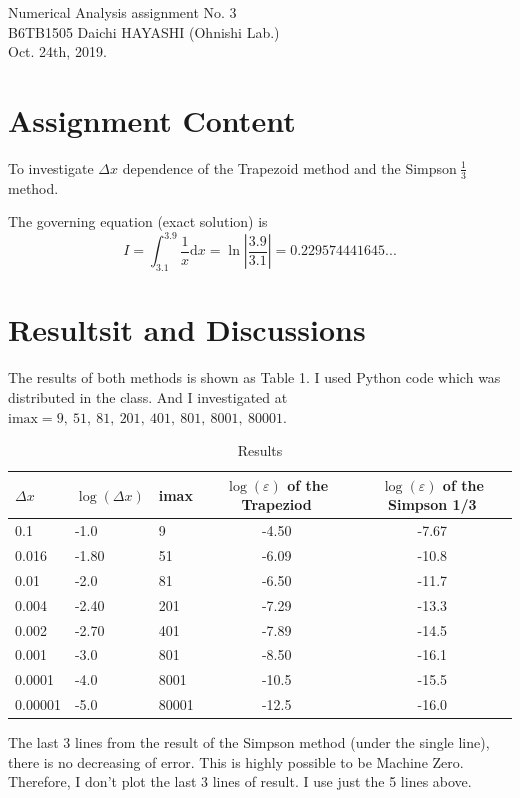 \documentclass[a4paper,11pt]{article}
\begin{document}
%
\begin{center}
  {\fontsize{16pt}{16pt}\selectfont Numerical Analysis assignment No. 3\\}
  \vspace{16pt}
  \fontsize{10.5pt}{12pt}\selectfont
  B6TB1505 Daichi HAYASHI (Ohnishi Lab.)\\
  \vspace{10.5pt}
  Oct. 24th, 2019.\\
  \vspace{-2mm}
\end{center}

\section{Assignment Content}
To investigate $\Delta x$ dependence of the Trapezoid method and the Simpson$~\frac13$ method.

The governing equation (exact solution) is
\begin{equation}
	I = \int_{3.1}^{3.9} \dfrac1x \mathrm{d}x = \ln\left|\dfrac{3.9}{3.1}\right| = 0.229574441645...
\end{equation}

\section{Resultsit and Discussions}
The results of both methods is shown as Table 1. I used Python code which was distributed in the class. And I investigated at	 $\mathrm{imax}= 9,\ 51,\ 81,\ 201,\ 401,\ 801,\  8001,\ 80001$.

\begin{table}[H]
\centering
\caption{Results}
\begin{tabular}{lllcc}
  $\Delta x$& $\log(\Delta x)$ & imax & $\log (\varepsilon)$ of the Trapeziod & $\log (\varepsilon)$ of the Simpson 1/3 \\
  \hline\hline
  0.1 & -1.0 & 9 & -4.50 & -7.67 \\
  0.016 & -1.80 & 51 & -6.09 & -10.8 \\
  0.01 & -2.0 & 81 & -6.50 & -11.7 \\
  0.004 & -2.40 & 201 & -7.29 & -13.3 \\
  0.002 & -2.70 & 401 & -7.89 & -14.5 \\ \hline
  0.001 & -3.0  & 801 & -8.50 & -16.1 \\
  0.0001 & -4.0 & 8001 & -10.5 & -15.5 \\
  0.00001 & -5.0 & 80001 & -12.5 & -16.0
\end{tabular}
\end{table}
The last 3 lines from the result of the Simpson method (under the single line), there is no decreasing of error. This is highly possible to be Machine Zero. Therefore, I don't plot the last 3 lines of result. I use just the 5 lines above.
\end{document}
